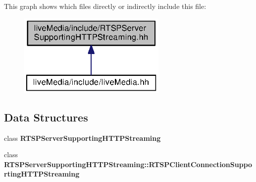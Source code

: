 This graph shows which files directly or indirectly include this file\+:
\nopagebreak
\begin{figure}[H]
\begin{center}
\leavevmode
\includegraphics[width=204pt]{RTSPServerSupportingHTTPStreaming_8hh__dep__incl}
\end{center}
\end{figure}
\subsection*{Data Structures}
\begin{DoxyCompactItemize}
\item 
class {\bf R\+T\+S\+P\+Server\+Supporting\+H\+T\+T\+P\+Streaming}
\item 
class {\bf R\+T\+S\+P\+Server\+Supporting\+H\+T\+T\+P\+Streaming\+::\+R\+T\+S\+P\+Client\+Connection\+Supporting\+H\+T\+T\+P\+Streaming}
\end{DoxyCompactItemize}
